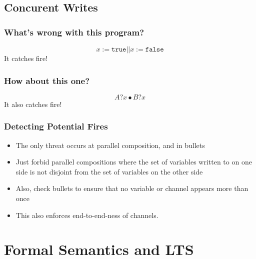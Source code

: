 \documentclass[compress]{beamer}
\begin{document}
\subsection{Concurent Writes}
\begin{frame}
\frametitle{What's wrong with this program?}
\begin{center}
    \begin{displaymath}
    x := \texttt{true} || x := \texttt{false}
    \end{displaymath}
    \pause
    \LARGE It catches fire!
\end{center}
\end{frame}
\begin{frame}
\frametitle{How about this one?}
\begin{center}
    \begin{displaymath}
    A?x \bullet B?x
    \end{displaymath}
    \pause
    \LARGE It also catches fire!
\end{center}
\end{frame}
\begin{frame}
\frametitle{Detecting Potential Fires}
\begin{itemize}
\item The only threat occurs at parallel composition, and in bullets
\pause
\item Just forbid parallel compositions where the set of variables written to on one side is not disjoint from the set of variables on the other side
\pause
\item Also, check bullets to ensure that no variable or channel appears more than once
\pause
\item This also enforces end-to-end-ness of channels.
\end{itemize}
\end{frame}
\section{Formal Semantics and LTS}
\end{document}
